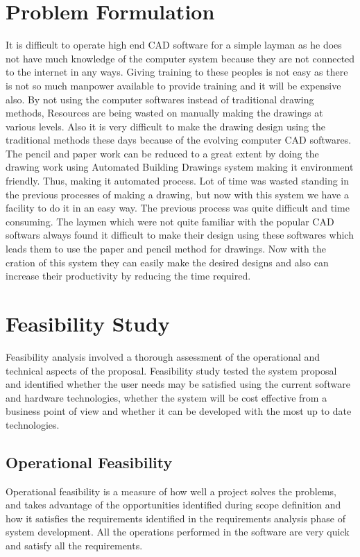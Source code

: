 \section{Problem Formulation}
It is difficult to operate high end CAD software for a simple layman as he does not have  much knowledge of the computer system because they are not connected to the internet in any ways. Giving training to these peoples is not easy as there is not so much manpower available to provide training and it will be expensive also. By not using the computer softwares instead of traditional drawing methods, Resources are being wasted 
on manually making the drawings at various levels.
Also it is very difficult to make the drawing design using the traditional methods these days because of the evolving computer CAD softwares. \\

\noindent The pencil and paper work can be reduced to a great extent by doing the drawing work using Automated Building Drawings system making it environment friendly. Thus, making it automated process. Lot of time was wasted standing in the previous processes of making a drawing, but now with this system we have a facility to do it in an easy way. The previous process was quite difficult and time consuming. The laymen which were not quite familiar with the popular CAD softwars always found it difficult to make their design using these softwares which leads them to use the paper and pencil method for drawings. Now with the cration of this system they can easily make the desired designs and also can increase their productivity by reducing the time required.


\section{Feasibility Study}
\noindent Feasibility analysis involved a thorough assessment of the operational and technical aspects of the proposal.
Feasibility study tested the system proposal and identified whether the user needs may be satisfied using
the current software and hardware technologies, whether the system will be cost effective from a business
point of view and whether it can be developed with the most up to date technologies.
\subsection{Operational Feasibility}
\noindent Operational feasibility is a measure of how well a project solves the problems, and takes advantage of
the opportunities identified during scope definition and how it satisfies the requirements identified in
the requirements analysis phase of system development. All the operations performed in the software
are very quick and satisfy all the requirements.

